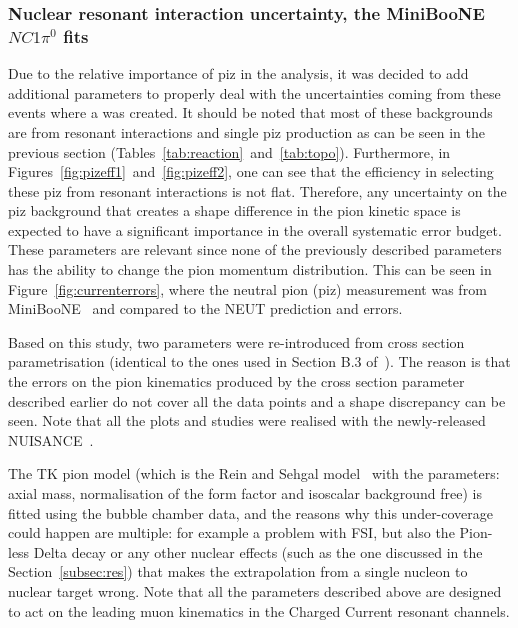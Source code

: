 \subsubsection{Nuclear resonant interaction uncertainty, the
  \Gls{MiniBooNE} \texorpdfstring{$NC1\pi^{0}$}{TEXT} fits}
\label{subpar:miniboonefits}
Due to the relative importance of \Gls{piz} in the analysis, it was
decided to add additional parameters to properly deal with the
uncertainties coming from these events where a \piz was created. It
should be noted that most of these backgrounds are from resonant
interactions and single \Gls{piz} production as can be seen in the
previous section
(Tables~\ref{tab:reaction}~and~\ref{tab:topo}). Furthermore, in
Figures~\ref{fig:pizeff1}~and~\ref{fig:pizeff2}, one can see that the
efficiency in selecting these \Gls{piz} from resonant interactions is
not flat.  Therefore, any uncertainty on the \Gls{piz} background that
creates a shape difference in the pion kinetic space is expected to
have a significant importance in the overall systematic error
budget. These parameters are relevant since none of the previously
described parameters has the ability to change the pion momentum
distribution. This can be seen in Figure~\ref{fig:currenterrors},
where the neutral pion (\Gls{piz}) measurement was from
\Gls{MiniBooNE}~\cite{AguilarArevalo:2009ww} and compared to the
\Gls{NEUT} prediction and errors.

Based on this study, two parameters were re-introduced from cross
section parametrisation (identical to the ones used in Section B.3
of~\cite{T2KLong}). The reason is that the errors on the pion
kinematics produced by the cross section parameter described earlier
do not cover all the data points and a shape discrepancy can be
seen. Note that all the plots and studies were realised with the
newly-released \Gls{NUISANCE}~\cite{NUISANCE2017}.

The \Gls{TK} pion model (which is the Rein and Sehgal
model~\cite{Rein1,Rein2} with the parameters: axial mass,
normalisation of the form factor and isoscalar background free) is
fitted using the bubble chamber data, and the reasons why this
under-coverage could happen are multiple: for example a problem with
\Gls{FSI}, but also the Pion-less Delta decay or any other nuclear
effects (such as the one discussed in the Section~\ref{subsec:res})
that makes the extrapolation from a single nucleon to nuclear target
wrong. Note that all the parameters described above are designed to
act on the leading muon kinematics in the Charged Current resonant
channels.

